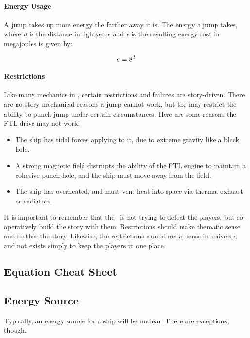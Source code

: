 \paragraph{Energy Usage}A jump takes up more energy the farther away it is. The energy a jump takes, where \textit{d} is the distance in lightyears and \textit{e} is the resulting energy cost in megajoules is given by:

\[e = 8^d\]

\paragraph{Restrictions}Like many mechanics in \getTitle, certain restrictions and failures are story-driven. There are no story-mechanical reasons a jump cannot work, but the \gm may restrict the ability to punch-jump under certain circumstances. Here are some reasons the FTL drive may not work:

\begin{itemize}
	\item The ship has tidal forces applying to it, due to extreme gravity like a black hole.
	\item A strong magnetic field distrupts the ability of the FTL engine to maintain a cohesive punch-hole, and the ship must move away from the field.
	\item The ship has overheated, and must vent heat into space via thermal exhuast or radiators.
\end{itemize}

\par It is important to remember that the \gm\, is not trying to defeat the players, but co-operatively build the story with them. Restrictions should make thematic sense and further the story. Likewise, the restrictions should make sense in-universe, and not exists simply to keep the players in one place.


\subsection{Equation Cheat Sheet}

\subsection{Energy Source}
\par
Typically, an energy source for a ship will be nuclear. There are exceptions, though.

